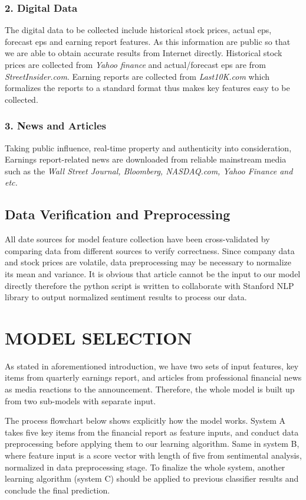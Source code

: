 \documentclass[letterpaper, 10 pt, conference]{ieeeconf}  %
\begin{document}
\subsubsection*{2. Digital Data}
The digital data to be collected include historical stock prices, actual eps, forecast eps and earning report features. As this information are public so that we are able to obtain accurate results from Internet directly. Historical stock prices are collected from \textit{Yahoo finance} and actual/forecast eps  are from \textit{StreetInsider.com}. Earning reports are collected from \textit{Last10K.com} which formalizes the reports to a standard format thus makes key features easy to be collected. 

\subsubsection*{3. News and Articles}
Taking public influence, real-time property and authenticity into consideration, Earnings report-related news are downloaded from reliable mainstream media such as the \textit{Wall Street Journal, Bloomberg, NASDAQ.com, Yahoo Finance and etc.}

\subsection{Data Verification and Preprocessing}
All date sources for model feature collection have been cross-validated by comparing data from different sources to verify correctness. Since company data and stock prices are volatile, data preprocessing may be necessary to normalize its mean and variance. It is obvious that article cannot be the input to our model directly therefore the python script is written to collaborate with Stanford NLP library to output normalized sentiment results to process our data.

\section{MODEL SELECTION}

As stated in aforementioned introduction, we have two sets of input features, key items from quarterly earnings report, and articles from professional financial news as media reactions to the announcement. Therefore, the whole model is built up from two sub-models with separate input.

The process flowchart below shows explicitly how the model works. System A takes five key items from the financial report as feature inputs, and conduct data preprocessing before applying them to our learning algorithm. Same in system B, where feature input is a score vector with length of five from sentimental analysis, normalized in data preprocessing stage. To finalize the whole system, another learning algorithm (system C) should be applied to previous classifier results and conclude the final prediction.
\end{document}
